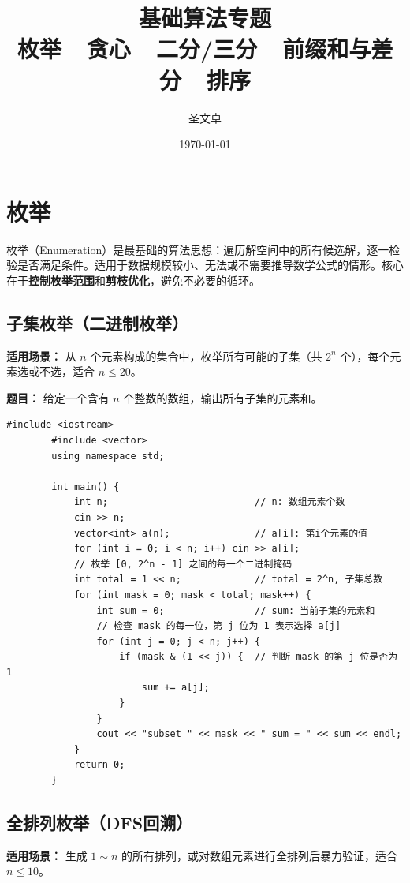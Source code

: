 \documentclass[12pt,a4paper]{ctexart}
\title{基础算法专题\\[5pt]
	\large 枚举\ \textbullet\ 贪心\ \textbullet\ 二分/三分\ \textbullet\ 前缀和与差分\ \textbullet\ 排序}
\author{圣文卓}
\date{\today}
\begin{document}
	
	\maketitle
	\tableofcontents
	\newpage
	
	\section{枚举}
	枚举（Enumeration）是最基础的算法思想：遍历解空间中的所有候选解，逐一检验是否满足条件。适用于数据规模较小、无法或不需要推导数学公式的情形。核心在于\textbf{控制枚举范围}和\textbf{剪枝优化}，避免不必要的循环。
	
	\subsection{子集枚举（二进制枚举）}
	\textbf{适用场景：} 从 $n$ 个元素构成的集合中，枚举所有可能的子集（共 $2^n$ 个），每个元素选或不选，适合 $n \le 20$。
	
	\textbf{题目：} 给定一个含有 $n$ 个整数的数组，输出所有子集的元素和。
	
	\begin{lstlisting}[caption={二进制枚举所有子集}]
		#include <iostream>
		#include <vector>
		using namespace std;
		
		int main() {
			int n;                          // n: 数组元素个数
			cin >> n;
			vector<int> a(n);               // a[i]: 第i个元素的值
			for (int i = 0; i < n; i++) cin >> a[i];
			// 枚举 [0, 2^n - 1] 之间的每一个二进制掩码
			int total = 1 << n;             // total = 2^n, 子集总数
			for (int mask = 0; mask < total; mask++) {
				int sum = 0;                // sum: 当前子集的元素和
				// 检查 mask 的每一位，第 j 位为 1 表示选择 a[j]
				for (int j = 0; j < n; j++) {
					if (mask & (1 << j)) {  // 判断 mask 的第 j 位是否为 1
						sum += a[j];
					}
				}
				cout << "subset " << mask << " sum = " << sum << endl;
			}
			return 0;
		}
	\end{lstlisting}
	
	\subsection{全排列枚举（DFS回溯）}
	\textbf{适用场景：} 生成 $1 \sim n$ 的所有排列，或对数组元素进行全排列后暴力验证，适合 $n \le 10$。
	
\end{document}
